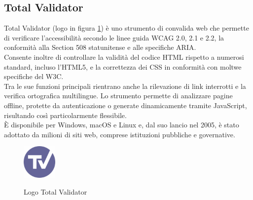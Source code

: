 \subsection{Total Validator}
\label{subsec:tv}
\noindent Total Validator (logo in figura \ref{fig:logo_TV}) è uno strumento di convalida web che permette di verificare l’accessibilità secondo le linee guida WCAG 2.0, 2.1 e 2.2, la conformità alla Section 508 statunitense e alle specifiche ARIA. \\Consente inoltre di controllare la validità del codice HTML rispetto a numerosi standard, incluso l’HTML5, e la correttezza dei CSS in conformità con moltwe specifiche del W3C. \\Tra le sue funzioni principali rientrano anche la rilevazione di link interrotti e la verifica ortografica multilingue. Lo strumento permette di analizzare pagine offline, protette da autenticazione o generate dinamicamente tramite JavaScript, risultando così particolarmente flessibile. \\È disponibile per Windows, macOS e Linux e, dal suo lancio nel 2005, è stato adottato da milioni di siti web, comprese istituzioni pubbliche e governative.
\begin{figure}[H]
    \centering
    \includegraphics[width=0.15\textwidth, alt={Logo Total Validator}]{img/totalvalidator.png}
    \caption[Logo Total Validator]{Logo Total Validator}\label{fig:logo_TV}
\end{figure}

